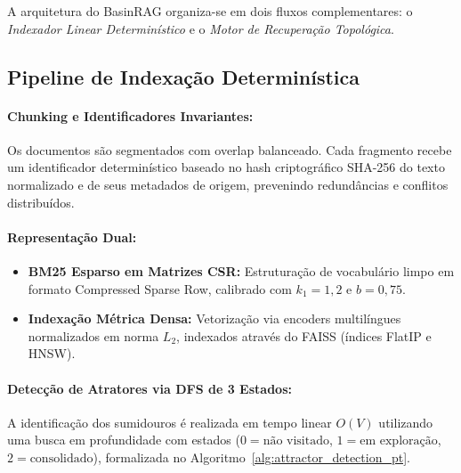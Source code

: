 \documentclass[10pt,twocolumn]{article}
\theoremstyle{definition}
\begin{document}
A arquitetura do BasinRAG organiza-se em dois fluxos complementares: o \textit{Indexador Linear Determinístico} e o \textit{Motor de Recuperação Topológica}.

\subsection{Pipeline de Indexação Determinística}

\paragraph{Chunking e Identificadores Invariantes:} Os documentos são segmentados com overlap balanceado. Cada fragmento recebe um identificador determinístico baseado no hash criptográfico SHA-256 do texto normalizado e de seus metadados de origem, prevenindo redundâncias e conflitos distribuídos.

\paragraph{Representação Dual:}
\begin{itemize}
    \item \textbf{BM25 Esparso em Matrizes CSR:} Estruturação de vocabulário limpo em formato Compressed Sparse Row, calibrado com $k_1 = 1,2$ e $b = 0,75$.
    \item \textbf{Indexação Métrica Densa:} Vetorização via encoders multilíngues normalizados em norma $L_2$, indexados através do FAISS (índices FlatIP e HNSW).
\end{itemize}

\paragraph{Detecção de Atratores via DFS de 3 Estados:}
A identificação dos sumidouros é realizada em tempo linear $O(V)$ utilizando uma busca em profundidade com estados ($0 = \text{não visitado}$, $1 = \text{em exploração}$, $2 = \text{consolidado}$), formalizada no Algoritmo~\ref{alg:attractor_detection_pt}.
\end{document}
